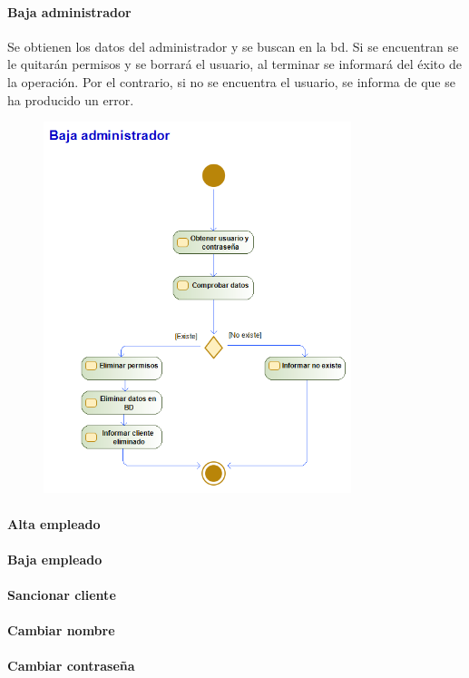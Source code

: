 \paragraph{Baja administrador}
Se obtienen los datos del administrador y se buscan en la \gls{bd}. Si se encuentran se le quitarán permisos y se borrará el usuario, al terminar se informará del éxito de la operación. Por el contrario, si no se encuentra el usuario, se informa  de que se ha producido un error.
\begin{figure}[H]
    \centering
    \includegraphics[width=0.8\textwidth]{Use_Cases/baja_admin.png}
\end{figure}
\paragraph{Alta empleado}
\paragraph{Baja empleado}
\paragraph{Sancionar cliente}
\paragraph{Cambiar nombre}
\paragraph{Cambiar contraseña}
